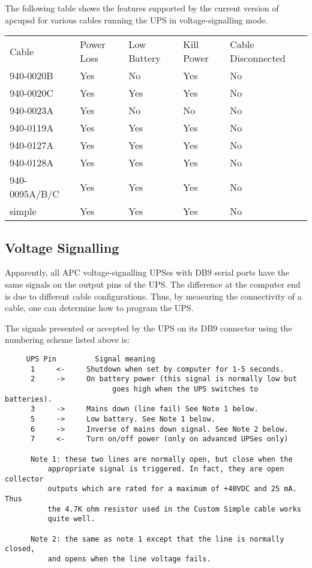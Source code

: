 The following table shows the features supported by the current version of
apcupsd for various cables running the UPS in voltage-signalling mode.  

\begin{longtable}{p{1.2in}p{0.8in}p{1.2in}p{0.8in}p{1.0in}}
{Cable} & {Power Loss} & {Low Battery} & {Kill Power} & {Cable Disconnected 
 } \\
{940-0020B} & {Yes} & {No} & {Yes} & {No 
 } \\
{940-0020C} & {Yes} & {Yes} & {Yes} & {No 
 } \\
{940-0023A} & {Yes} & {No} & {No} & {No 
 } \\
{940-0119A} & {Yes} & {Yes} & {Yes} & {No 
 } \\
{940-0127A} & {Yes} & {Yes} & {Yes} & {No 
 } \\
{940-0128A} & {Yes} & {Yes} & {Yes} & {No 
 } \\
{940-0095A/B/C} & {Yes} & {Yes} & {Yes} & {No 
 } \\
{simple} & {Yes} & {Yes} & {Yes} & {No  
}

\end{longtable}

\subsection*{Voltage Signalling}

Apparently, all APC voltage-signalling UPSes with DB9 serial ports have the 
same signals on the output pins of the UPS. The difference at the computer 
end is due to different cable configurations. Thus, by measuring the 
connectivity of a cable, one can determine how to program the UPS.

The signals presented or accepted by the UPS on its DB9 connector using the
numbering scheme listed above is: 

\footnotesize
\begin{verbatim}
     UPS Pin         Signal meaning
      1     <-     Shutdown when set by computer for 1-5 seconds.
      2     ->     On battery power (this signal is normally low but
                         goes high when the UPS switches to batteries).
      3     ->     Mains down (line fail) See Note 1 below.
      5     ->     Low battery. See Note 1 below.
      6     ->     Inverse of mains down signal. See Note 2 below.
      7     <-     Turn on/off power (only on advanced UPSes only)
     
      Note 1: these two lines are normally open, but close when the
          appropriate signal is triggered. In fact, they are open collector
          outputs which are rated for a maximum of +40VDC and 25 mA. Thus
          the 4.7K ohm resistor used in the Custom Simple cable works
          quite well.
     
      Note 2: the same as note 1 except that the line is normally closed,
          and opens when the line voltage fails.
\end{verbatim}
\normalsize

